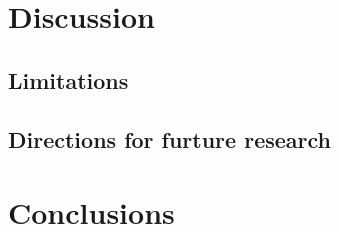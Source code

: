 \documentclass[preprint, 3p,
authoryear]{elsarticle} %
\begin{document}
\hypertarget{discussion}{%
\section{Discussion}\label{discussion}}

\hypertarget{limitations}{%
\subsection{Limitations}\label{limitations}}

\hypertarget{directions-for-furture-research}{%
\subsection{Directions for furture
research}\label{directions-for-furture-research}}

\hypertarget{conclusions}{%
\section{Conclusions}\label{conclusions}}

\renewcommand\refname{References}

\end{document}
